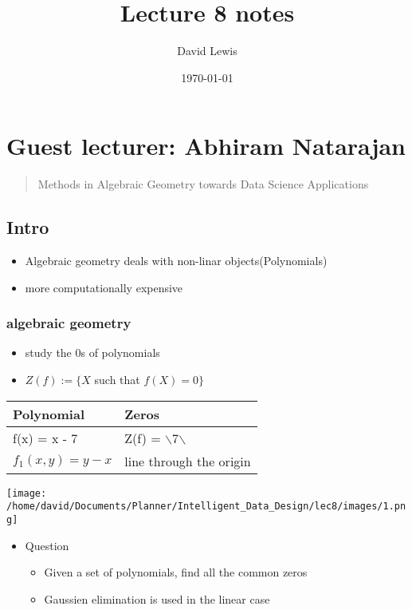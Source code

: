 \documentclass[11pt]{article}
\author{David Lewis}
\date{\today}
\title{Lecture 8 notes}
\begin{document}
\maketitle

\section*{Guest lecturer: Abhiram Natarajan}
\label{sec:org7240c16}
\begin{quote}
Methods in Algebraic Geometry towards Data Science Applications
\end{quote}
\subsection*{Intro}
\label{sec:org70a763f}
\begin{itemize}
\item Algebraic geometry deals with  non-linar objects(Polynomials)
\item more computationally expensive
\end{itemize}
\subsubsection*{algebraic geometry}
\label{sec:org594515c}
\begin{itemize}
\item study the 0s of polynomials
\item \(Z(f):=\{X\) such that \(f(X) = 0\}\)
\end{itemize}
\begin{center}
\begin{tabular}{ll}
Polynomial & Zeros\\
\hline
f(x) = x - 7 & Z(f) = $\backslash${7$\backslash$}\\
\(f_1(x,y) = y-x\) & line through the origin\\
\end{tabular}
\end{center}
\texttt{[image: /home/david/Documents/Planner/Intelligent\_Data\_Design/lec8/images/1.png]}
\begin{itemize}
\item Question
\label{sec:org7db365e}
\begin{itemize}
\item Given a set of polynomials, find all the common zeros
\item Gaussien elimination is used in the linear case
\end{itemize}
\end{itemize}
\end{document}
